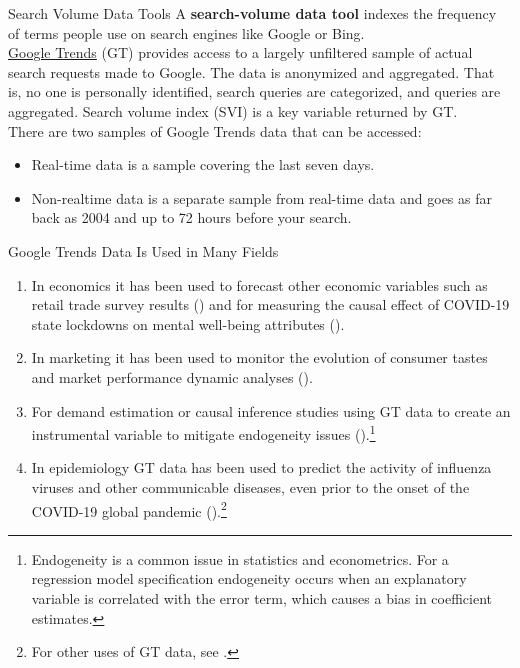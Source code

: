 \documentclass[pdf]{beamer}
\newcommand{\empr}[1]{{\color{franklinblue}\textbf{#1}}}
\theoremstyle{remark}
\theoremstyle{definition}
\begin{document}
\begin{frame}[t]{Search Volume Data Tools}
A \empr{search-volume data tool} indexes the frequency of terms people use on search engines like Google or Bing. \\
\vspace{1.5ex}
\href{https://support.google.com/trends/answer/6248105?hl=en&ref_topic=6248052}{Google Trends} (GT) provides access to a largely unfiltered sample of actual search requests made to Google. The data is anonymized and aggregated.  That is, no one is personally identified, search queries are categorized, and queries are aggregated. Search volume index (SVI) is a key variable returned by GT.\\
\vspace{1.5ex}
There are two samples of Google Trends data that can be accessed:
\begin{itemize}
  \item Real-time data is a sample covering the last seven days.
  \item Non-realtime data is a separate sample from real-time data and goes as far back as 2004 and up to 72 hours before your search.
\end{itemize}
 \end{frame}

\begin{frame}[t]{Google Trends Data Is Used in Many Fields}
\small
\begin{enumerate}
\item In economics it has been used to forecast other economic variables such as retail trade survey results (\cite{robin2018}) and for measuring the causal effect of COVID-19 state lockdowns on mental well-being attributes (\cite{brodeur2021}).
\item In marketing it has been used to monitor the evolution of consumer tastes and market performance dynamic analyses (\cite{du2015}). 
\item For demand estimation or causal inference studies using GT data to create  an instrumental variable to mitigate endogeneity issues (\cite{barron2020}).\footnote{Endogeneity is a common issue in statistics and econometrics.  For a regression model specification endogeneity occurs when an explanatory variable is correlated with the error term, which causes a bias in coefficient estimates.}
\item In epidemiology GT data has been used to predict the activity of influenza viruses and other communicable diseases, even prior to the onset of the COVID-19 global pandemic (\cite{ginsberg2009}).\footnote{For other uses of GT data, see \cite{jun2018}.}
\end{enumerate}
\end{frame}
\end{document}
